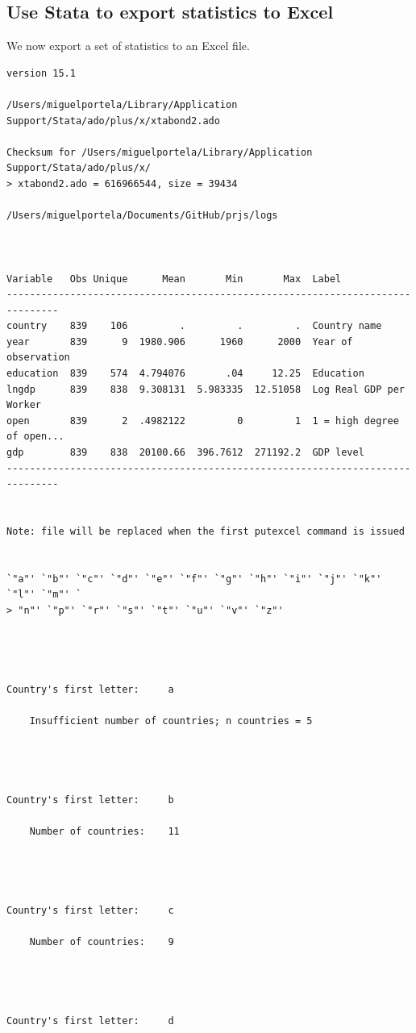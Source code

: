 \documentclass[
  12pt,
]{article}
\begin{document}
\hypertarget{use-stata-to-export-statistics-to-excel}{%
\subsection{Use Stata to export statistics to Excel}\label{use-stata-to-export-statistics-to-excel}}

We now export a set of statistics to an Excel file.

\begin{verbatim}
version 15.1

/Users/miguelportela/Library/Application Support/Stata/ado/plus/x/xtabond2.ado

Checksum for /Users/miguelportela/Library/Application Support/Stata/ado/plus/x/
> xtabond2.ado = 616966544, size = 39434

/Users/miguelportela/Documents/GitHub/prjs/logs



Variable   Obs Unique      Mean       Min       Max  Label
-------------------------------------------------------------------------------
country    839    106         .         .         .  Country name
year       839      9  1980.906      1960      2000  Year of observation
education  839    574  4.794076       .04     12.25  Education
lngdp      839    838  9.308131  5.983335  12.51058  Log Real GDP per Worker
open       839      2  .4982122         0         1  1 = high degree of open...
gdp        839    838  20100.66  396.7612  271192.2  GDP level
-------------------------------------------------------------------------------


Note: file will be replaced when the first putexcel command is issued


`"a"' `"b"' `"c"' `"d"' `"e"' `"f"' `"g"' `"h"' `"i"' `"j"' `"k"' `"l"' `"m"' `
> "n"' `"p"' `"r"' `"s"' `"t"' `"u"' `"v"' `"z"'




Country's first letter:     a

    Insufficient number of countries; n countries = 5




Country's first letter:     b

    Number of countries:    11




Country's first letter:     c

    Number of countries:    9




Country's first letter:     d


\end{verbatim}
\end{document}
